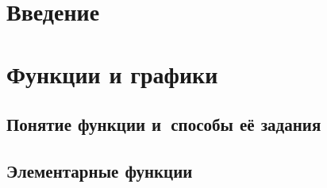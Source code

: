 \documentclass[14pt, oneside]{extbook}
\begin{document}
\chapter*{Введение}


\chapter{Функции и графики}
\section{Понятие функции и~способы её задания}

\section{Элементарные функции}

\end{document}
